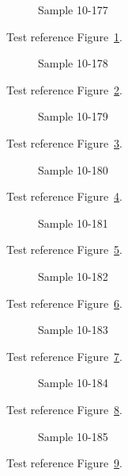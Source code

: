 \begin{figure}[tbhp]
\caption{Sample 10-177}
\label{fig:sample-10-177}
\end{figure}

Test reference Figure~\ref{fig:sample-10-177}.

\begin{figure}[tbhp]
\caption{Sample 10-178}
\label{fig:sample-10-178}
\end{figure}

Test reference Figure~\ref{fig:sample-10-178}.

\begin{figure}[tbhp]
\caption{Sample 10-179}
\label{fig:sample-10-179}
\end{figure}

Test reference Figure~\ref{fig:sample-10-179}.

\begin{figure}[tbhp]
\caption{Sample 10-180}
\label{fig:sample-10-180}
\end{figure}

Test reference Figure~\ref{fig:sample-10-180}.

\begin{figure}[tbhp]
\caption{Sample 10-181}
\label{fig:sample-10-181}
\end{figure}

Test reference Figure~\ref{fig:sample-10-181}.

\begin{figure}[tbhp]
\caption{Sample 10-182}
\label{fig:sample-10-182}
\end{figure}

Test reference Figure~\ref{fig:sample-10-182}.

\begin{figure}[tbhp]
\caption{Sample 10-183}
\label{fig:sample-10-183}
\end{figure}

Test reference Figure~\ref{fig:sample-10-183}.

\begin{figure}[tbhp]
\caption{Sample 10-184}
\label{fig:sample-10-184}
\end{figure}

Test reference Figure~\ref{fig:sample-10-184}.

\begin{figure}[tbhp]
\caption{Sample 10-185}
\label{fig:sample-10-185}
\end{figure}

Test reference Figure~\ref{fig:sample-10-185}.

